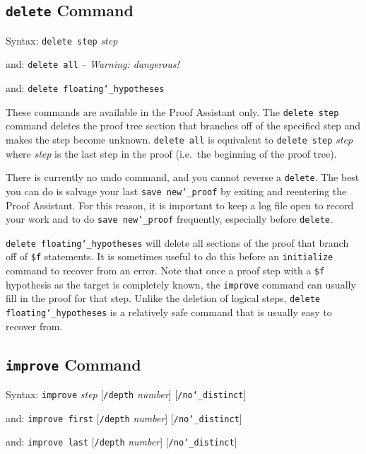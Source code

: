 \subsection{\texttt{delete} Command}
Syntax:  \texttt{delete step} {\em step}

   and:      \texttt{delete all} -- {\em Warning: dangerous!}

   and:      \texttt{delete floating{\char`\_}hypotheses}

These commands are available in the Proof Assistant only.  The
\texttt{delete step} command deletes the proof tree section that
branches off of the specified step and makes the step become unknown.
\texttt{delete all} is equivalent to \texttt{delete step} {\em step}
where {\em step} is the last step in the proof (i.e.\ the beginning of
the proof tree).

There is currently no undo command, and you cannot reverse a
\texttt{delete}.  The best you can do is salvage your last \texttt{save
new{\char`\_}proof} by exiting and reentering the Proof Assistant.  For
this reason, it is important to keep a log file open to record your work
and to do \texttt{save new{\char`\_}proof} frequently, especially before
\texttt{delete}.

\texttt{delete floating{\char`\_}hypotheses} will delete all sections of
the proof that branch off of \texttt{\$f}
statements.  It is sometimes useful to do this before an
\texttt{initialize} command to recover from an error.  Note that once a
proof step with a \texttt{\$f} hypothesis as the target is completely
known, the \texttt{improve} command can usually fill in the proof for
that step.  Unlike the deletion of logical steps, \texttt{delete
floating{\char`\_}hypotheses} is a relatively safe command that is
usually easy to recover from.



\subsection{\texttt{improve} Command}
\label{improve}
Syntax:  \texttt{improve} {\em step} [\texttt{/depth} {\em number}]
                                               [\texttt{/no{\char`\_}distinct}]

   and:   \texttt{improve first} [\texttt{/depth} {\em number}]
                                              [\texttt{/no{\char`\_}distinct}]

   and:   \texttt{improve last} [\texttt{/depth} {\em number}]
                                              [\texttt{/no{\char`\_}distinct}]

